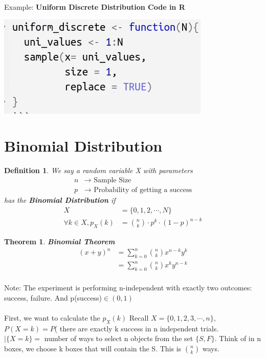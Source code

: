 \documentclass[11pt,oneside]{book}
\theoremstyle{break}
\theoremstyle{break}
\newtheorem{thm}{Theorem}[section]
\newtheorem{defn}{Definition}[corL]
\newcommand{\note}{\color{Purple}Note: \color{black}}
\newcommand{\example}{\color{WildStrawberry}Example: \color{black}}
\begin{document}
\example \textbf{Uniform Discrete Distribution Code in R}\begin{center}
\includegraphics[scale=0.5]{figures/uniform_dis_code}
\end{center}
\section[Binomial Distribution]{Binomial Distribution}
\begin{defn}
We say a random variable X with parameters\begin{align*}
n &\rightarrow \text{ Sample Size}\\
p&\rightarrow \text{ Probability of getting a success}
\end{align*}
has the \textbf{Binomial Distribution} if \begin{align*}
X&=\{0,1,2,\cdots,N\}\\
\forall k\in X,p_X(k)&=\binom nk \cdot p^k \cdot (1-p)^{n-k}
\end{align*}
\end{defn}
\begin{thm}
\textbf{Binomial Theorem}\\
\begin{align*}
(x+y)^n&=\sum_{k=0}^{n}\binom nk x^{n-k}y^k\\
&=\sum_{k=0}^{n}\binom nk x^ky^{n-k}\\
\end{align*}
\end{thm}
\note The experiment is performing n-independent with exactly two outcomes: success, failure. And  p(success)$\in (0,1)$\\
\hfill\\
First, we want to calculate the $p_X(k)$  
Recall $X=\{0,1,2,3,\cdots, n\}$, $P(X=k)=P$( there are exactly k success in n independent trials.\\
$|\{X=k\}=$ number of ways to select n objects from the set $\{S,F\}$. Think of in n boxes, we choose k boxes that will contain the S. This is $\binom nk$ ways.\\
\end{document}
